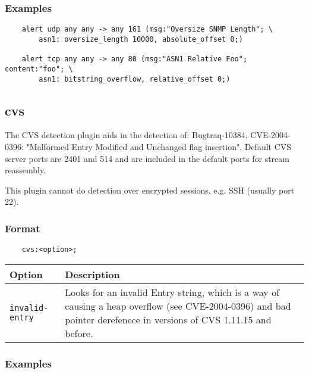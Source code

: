 \documentclass[english]{report}
\newenvironment{note}{
\samepage
    \vspace{10pt}{\textsf{
        {\hspace{7pt}\Huge{$\triangle$\hspace{-12.5pt}{\Large{$^!$}}}}\hspace{5pt}
        {\Large{NOTE}}
    }
    }
   \begin{center}
    \par\vspace{-17pt}

    \begin{lrbox}{\savepar}
    \begin{minipage}[r]{6in}
}
{
    \end{minipage}
    \end{lrbox}
    \fbox{
        \usebox{
            \savepar
	}
    }
    \par\vskip10pt
    \end{center}
}
\newenvironment{note}{
        \begin{rawhtml}
        <p><table border="1"><tr><td><b>
        Note:&nbsp;&nbsp;</b>
        \end{rawhtml}
}{
        \begin{rawhtml}
        </b></td></tr></table></p>
        \end{rawhtml}
}
\begin{document}
\subsubsection{Examples}

\begin{verbatim}
    alert udp any any -> any 161 (msg:"Oversize SNMP Length"; \
        asn1: oversize_length 10000, absolute_offset 0;)
        
    alert tcp any any -> any 80 (msg:"ASN1 Relative Foo"; content:"foo"; \
        asn1: bitstring_overflow, relative_offset 0;)
\end{verbatim}

\subsection{cvs}

The CVS detection plugin aids in the detection of: Bugtraq-10384,
CVE-2004-0396: "Malformed Entry Modified and Unchanged flag insertion".
Default CVS server ports are 2401 and 514 and are included in the default ports
for stream reassembly.

\begin{note}

This plugin cannot do detection over encrypted sessions, e.g. SSH (usually port
22).

\end{note}

\subsubsection{Format}

\begin{verbatim}
    cvs:<option>;
\end{verbatim}

\begin{tabular}{| l | p{4.5in} |}
\hline
{\bf Option} & {\bf Description}\\
\hline

\hline
\texttt{invalid-entry} &

Looks for an invalid Entry string, which is a way of causing a heap overflow
(see CVE-2004-0396) and bad pointer derefenece in versions of CVS 1.11.15 and
before.\\

\hline
\end{tabular}

\subsubsection{Examples}
\end{document}
